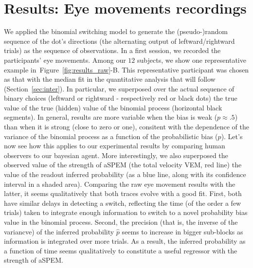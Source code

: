 \documentclass[profile,final,english,draft]{article}%
\newcommand{\seeFig}[1]{Figure~\ref{fig:#1}}
\newcommand{\seeSec}[1]{Section~\ref{sec:#1}}
\begin{document}
\section{Results: Eye movements recordings}
\label{sec:eye_rec}
We applied the binomial switching model
to generate the (pseudo-)random sequence of
the dot's directions (the alternating output of leftward/rightward trials)
as the sequence of observations.
In a first session, we recorded the participants' eye movements.
Among our $12$ subjects,
we show one representative example in~\seeFig{results_raw}-B.
This representative participant was chosen as that
with the median fit in the quantitative analysis
that will follow (\seeSec{inter}).
In particular, we superposed over the actual sequence of binary choices
(leftward or rightward - respectively red or black dots)
the true value of the true (hidden) value
of the binomial process (horizontal black segments).
In general, results are more variable when the bias is weak ($p\approx .5$)
than when it is strong (close to zero or one),
consitent with the dependence of the variance of the binomial process
as a function of the probabilistic bias ($p$).
Let's now see how this applies to our experimental results
by comparing human observers to our bayesian agent.
More interestingly, we also superposed
the observed value of the strength of aSPEM
(the total velocity VEM, red line)
the value of the readout inferred probability
(as a blue line, along with its confidence interval in a shaded area).
Comparing the raw eye movement results with the latter,
it seems qualitatively that both traces evolve with a good fit.
First, both have similar delays in detecting a switch,
reflecting the time (of the order a few trials) taken to integrate enough information
to switch to a novel probability bias value in the binomial process.
Second, the precision (that is, the inverse of the variancve)
of the inferred probability $\hat{p}$ seems to increase
in bigger sub-blocks as information is integrated over more trials.
As a result, the inferred probability as a function of time
seems qualitatively to constitute a useful regressor
with the strength of aSPEM.
\end{document}
